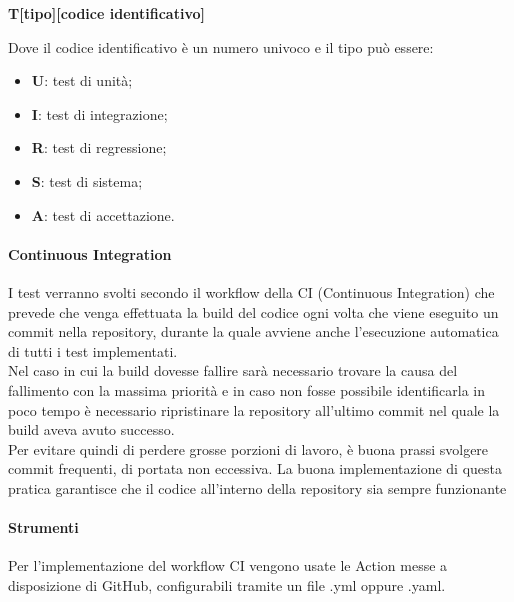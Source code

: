\begin{center} \textbf{T[tipo][codice identificativo]} \end{center}

Dove il codice identificativo è un numero univoco e il tipo può essere:
\begin{itemize}
	\item \textbf{U}: test di unità;
	\item \textbf{I}: test di integrazione;
	\item \textbf{R}: test di regressione;
	\item \textbf{S}: test di sistema;
	\item \textbf{A}: test di accettazione.
\end{itemize}

\paragraph{Continuous Integration}
I test verranno svolti secondo il workflow della CI (Continuous Integration) che prevede che venga effettuata la build del codice ogni volta che viene eseguito un commit nella repository, durante la quale avviene anche l'esecuzione automatica di tutti i test implementati.\\
Nel caso in cui la build dovesse fallire sarà necessario trovare la causa del fallimento con la massima priorità e in caso non fosse possibile identificarla in poco tempo è necessario ripristinare la repository all'ultimo commit nel quale la build aveva avuto successo.\\
Per evitare quindi di perdere grosse porzioni di lavoro, è buona prassi svolgere commit frequenti, di portata non eccessiva.
La buona implementazione di questa pratica garantisce che il codice all'interno della repository sia sempre funzionante

\paragraph{Strumenti}
Per l'implementazione del workflow CI vengono usate le Action messe a disposizione di GitHub, configurabili tramite un file .yml oppure .yaml.